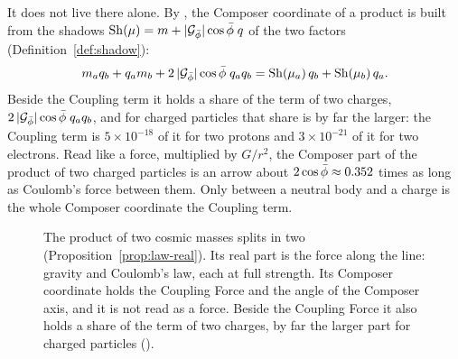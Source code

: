 It does not live there alone. By , the Composer coordinate of a product is built from the shadows $\operatorname{Sh}(\mu) = m + |\mathcal{G}_{\bar{\phi}}|\cos\bar{\phi}\;q$ of the two factors (Definition~\ref{def:shadow}):
\[
m_a q_b + q_a m_b + 2\,|\mathcal{G}_{\bar{\phi}}|\cos\bar{\phi}\;q_a q_b = \operatorname{Sh}(\mu_a)\,q_b + \operatorname{Sh}(\mu_b)\,q_a .
\]
Beside the Coupling term it holds a share of the term of two charges, $2\,|\mathcal{G}_{\bar{\phi}}|\cos\bar{\phi}\;q_a q_b$, and for charged particles that share is by far the larger: the Coupling term is $5 \times 10^{-18}$ of it for two protons and $3 \times 10^{-21}$ of it for two electrons. Read like a force, multiplied by $G/r^2$, the Composer part of the product of two charged particles is an arrow about $2\cos\bar{\phi} \approx 0.352$ times as long as Coulomb's force between them. Only between a neutral body and a charge is the whole Composer coordinate the Coupling term.

\begin{figure}[tb]
\myfloatalign
{}
\caption[The product splits in two]{The product of two cosmic masses splits in two (Proposition~\ref{prop:law-real}). Its real part is the force along the line: gravity and Coulomb's law, each at full strength. Its Composer coordinate holds the Coupling Force and the angle of the Composer axis, and it is not read as a force. Beside the Coupling Force it also holds a share of the term of two charges, by far the larger part for charged particles ().}
\label{fig:square-split}
\end{figure}

